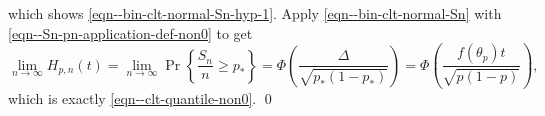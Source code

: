 which shows \eqref{eqn--bin-clt-normal-Sn-hyp-1}.
Apply \eqref{eqn--bin-clt-normal-Sn} with
\eqref{eqn--Sn-pn-application-def-non0} to get
\begin{equation*}
  \lim_{n \to \infty} H_{p, n} (t) = \lim_{n \to \infty} \Pr \left\{
  \frac{S_{n}}{n} \geq p_{\ast} \right\} = \Phi \left(
  \frac{\Delta}{\sqrt{p_{\ast} \left( 1 - p_{\ast} \right)}} \right) = \Phi
  \left( \frac{f \left( \theta_{p} \right) t}{\sqrt{p (1 - p)}} \right),
\end{equation*}
which is exactly \eqref{eqn--clt-quantile-non0}.
\qed


